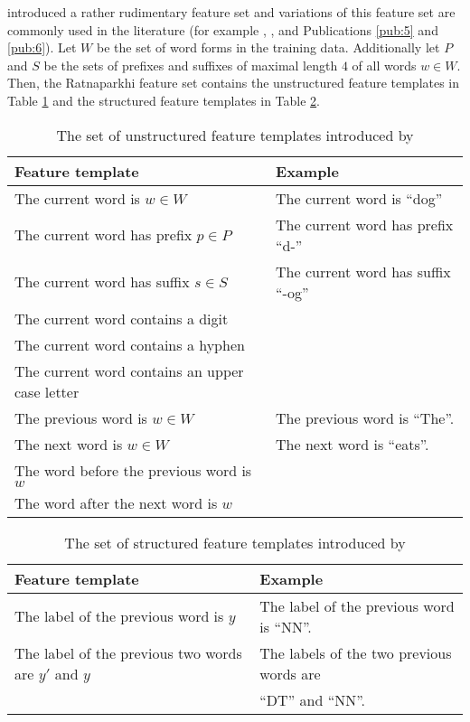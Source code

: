 \cite{Ratnaparkhi1996} introduced a rather rudimentary feature set and
variations of this feature set are commonly used in the literature
(for example \cite{Collins2002}, \cite{Lafferty2001}, and Publications \ref{pub:5} and \ref{pub:6}). Let $W$ be
the set of word forms in the training data. Additionally let $P$ and
$S$ be the sets of prefixes and suffixes of maximal length $4$ of all
words $w \in W$. Then, the Ratnaparkhi feature set contains the
unstructured feature templates in Table \ref{tab:uratna} and the
structured feature templates in Table \ref{tab:sratna}.

\begin{table}[!htb]
\begin{tabular}{ll}  
Feature template & Example\\
\hline
The current word is $w \in W$ & The current word is ``dog''\\
The current word has prefix $p\in P$ & The current word has prefix ``d-''\\
The current word has suffix $s\in S$ & The current word has suffix ``-og''\\
The current word contains a digit & \\
The current word contains a hyphen & \\
The current word contains an upper case letter & \\
The previous word is $w \in W$ & The previous word is ``The''. \\
The next word is $w\in W$ & The next word is ``eats''. \\
The word before the previous word is $w$ & \\
The word after the next word is $w$ & \\
\end{tabular}
\caption{The set of unstructured feature templates introduced by \cite{Ratnaparkhi1996}}\label{tab:uratna}
\end{table}

\begin{table}[!htb]
\begin{tabular}{ll}
Feature template & Example\\
\hline
The label of the previous word is $y$ & The label of the previous word is ``NN''. \\
The label of the previous two words are $y'$ and $y$ & The labels of the two previous words are\\
 & ``DT'' and ``NN''. 
\end{tabular}
\caption{The set of structured feature templates introduced by \cite{Ratnaparkhi1996}}\label{tab:sratna}
\end{table}

